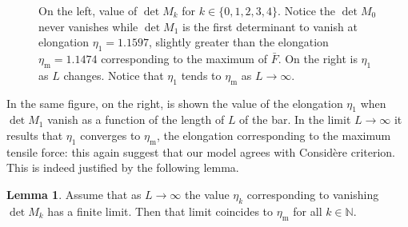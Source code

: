 \documentclass[a4paper,10pt,oneside]{amsbook}
\numberwithin{section}{chapter}
\numberwithin{equation}{chapter}
\theoremstyle{definition}
\newtheorem{lemma}[prop]{Lemma}
\begin{document}
\begin{figure}[htp]
\hfill
{}
\caption{On the left, value of $\det M_k$ for $k\in\{0,1,2,3,4\}$. Notice the $\det M_0$ never vanishes while $\det M_1$ is the first determinant to vanish at elongation $\eta_1=1.1597$, slightly greater than the elongation $\eta_\text{m}=1.1474$ corresponding to the maximum of $\bar F$. On the right is $\eta_1$ as $L$ changes. Notice that $\eta_1$ tends to $\eta_\text{m}$ as $L\to\infty$.}
\label{fig:dets}
\end{figure}
In the same figure, on the right, is shown the value of the elongation $\eta_1$ when $\det M_1$ vanish as a function of the length of $L$ of the bar. In the limit $L\to\infty$ it results that $\eta_1$ converges to $\eta_\text{m}$, the elongation corresponding to the maximum tensile force: this again suggest that our model agrees with Considère criterion. This is indeed justified by the following lemma.
\begin{lemma}
Assume that as $L\to\infty$ the value $\eta_k$ corresponding to vanishing $\det M_k$ has a finite limit. Then that limit coincides to $\eta_\text{m}$ for all $k\in\mathbb{N}$.
\end{lemma}
\end{document}
